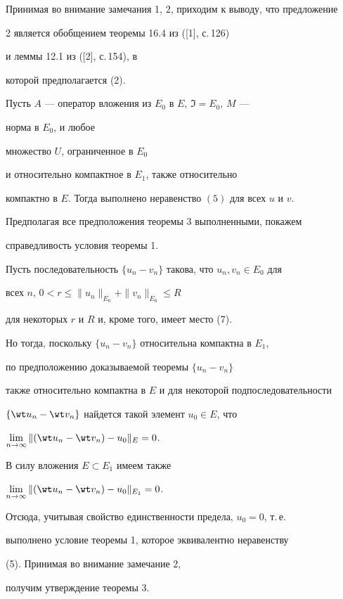  


\begin{note} 


Принимая во внимание замечания 1, 2, приходим к выводу, что предложение 


2 является обобщением теоремы 16.4 из ([1], с.\,126) 


и леммы 12.1 из ([2], с.\,154), в  


которой предполагается (2). 


\end{note} 


 


\begin{thm} 


Пусть $A$ --- оператор вложения из $E_0$ в $E$, $\Im=E_0$, $M$ --- 


норма в $E_0$, и любое  


множество $U$, ограниченное в $E_0$ 


и относительно компактное в $E_1$, также относительно  


компактно в $E$. Тогда выполнено неравенство $(5)$ для всех $u$ и $v$. 


\end{thm} 


 


\begin{pf} 


Предполагая все предположения теоремы 3 выполненными, покажем 


справедливость условия теоремы 1. 


Пусть последовательность $\{u_n-v_n\}$ такова, что $u_n,v_n\in E_0$ для 


всех $n$, $0<r\le\|u_n\|_{E_0}+\|v_n\|_{E_0}\le R$ 


для некоторых $r$ и $R$ и, кроме того, имеет место (7). 


Но тогда, поскольку $\{u_n-v_n\}$ относительна компактна в $E_1$, 


по предположению доказываемой теоремы $\{u_n-v_n\}$ 


также относительно компактна в $E$ и для некоторой подпоследовательности 


$\{\wt u_n-\wt v_n\}$ найдется такой элемент $u_0\in E$, что 


$\lim\limits_{n\to\infty}\|(\wt u_n-\wt v_n)-u_0\|_E=0$. 


В силу вложения $E\subset E_1$ имеем также 


$\lim\limits_{n\to\infty}\|(\wt u_n-\wt v_n)-u_0\|_{E_1}=0$. 


Отсюда, учитывая свойство единственности предела, $u_0=0$, т.\,е. 


выполнено условие теоремы 1, которое эквивалентно неравенству 


(5). Принимая во внимание замечание 2,  


получим утверждение теоремы 3. 


\end{pf} 


